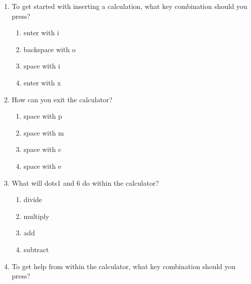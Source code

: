 \documentclass[10pt,letterpaper,twoside]{report}
\begin{document}
{{{{\begin{enumerate}
\begin{enumerate}
		      \item the minus sign
		            
		      \item the percent key
		            
		            
	      \end{enumerate}
	\item To get started with inserting a calculation, what key combination should you press?
	      
	      \begin{enumerate}
		      \item enter with i
		            
		      \item backspace with o
		            
		      \item space with i
		            
		      \item enter with x
		            
		            
	      \end{enumerate}
	\item How can you exit the calculator?
	      
	      \begin{enumerate}
		      \item space with p
		            
		      \item space with m
		            
		      \item space with c
		            
		      \item space with e
		            
		            
	      \end{enumerate}
	\item What will dots1 and 6 do within the calculator?
	      
	      \begin{enumerate}
		      \item divide
		            
		      \item multiply
		            
		      \item add
		            
		      \item subtract
		            
		            
	      \end{enumerate}
	\item To get help from within the calculator, what key combination should you press?
	      

\end{enumerate}}}}}
\end{document}
